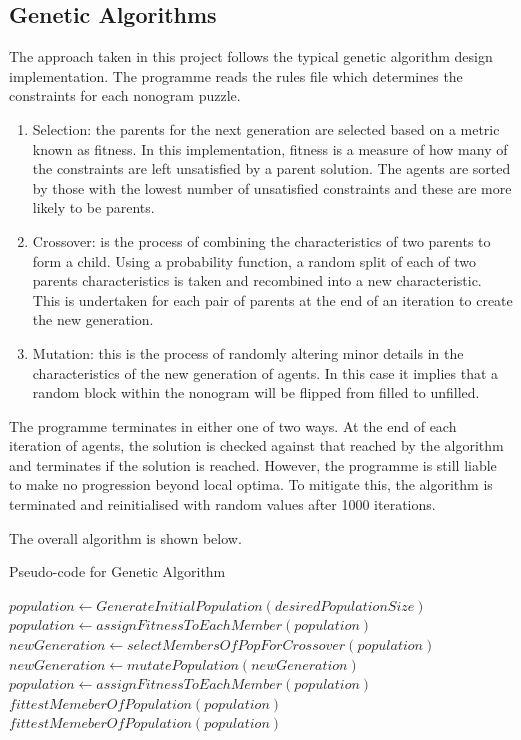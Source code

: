 \documentclass{svproc}
\begin{document}
\subsection{Genetic Algorithms}
The approach taken in this project follows the typical genetic algorithm design implementation. The programme reads the rules file which determines the constraints for each nonogram puzzle.
\begin{enumerate}
\item Selection:
the parents for the next generation are selected based on a metric known as fitness. In this implementation, fitness is a measure of how many of the constraints are left unsatisfied by a parent solution. The agents are sorted by those with the lowest number of unsatisfied constraints and these are more likely to be parents.

\item Crossover:
is the process of combining the characteristics of two parents to form a child. Using a probability function, a random split of each of two parents characteristics is taken and recombined into a new characteristic. This is undertaken for each pair of parents at the end of an iteration to create the new generation.

\item Mutation: this is the process of randomly altering minor details in the characteristics of the new generation of agents. In this case it implies that a random block within the nonogram will be flipped from filled to unfilled.
\end{enumerate}
The programme terminates in either one of two ways. At the end of each iteration of agents, the solution is checked against that reached by the algorithm and terminates if the solution is reached. However, the programme is still liable to make no progression beyond local optima. To mitigate this, the algorithm is terminated and reinitialised with random values after 1000 iterations.

The overall algorithm is shown below.

\begin{algorithm}
	\caption{Pseudo-code for Genetic Algorithm}
	\label{fig:garun}
	\begin{algorithmic}
		\State $population \gets GenerateInitialPopulation(desiredPopulationSize)$
		\State $population \gets assignFitnessToEachMember(population)$
		\State $newGeneration \gets selectMembersOfPopForCrossover(population)$
		\State $newGeneration \gets mutatePopulation(newGeneration)$
		\State $population \gets assignFitnessToEachMember(population)$
		\State \Return $fittestMemeberOfPopulation(population)$
		\EndIf
		\EndWhile
		\State \Return $fittestMemeberOfPopulation(population)$

	\end{algorithmic}
\end{algorithm}
\end{document}
